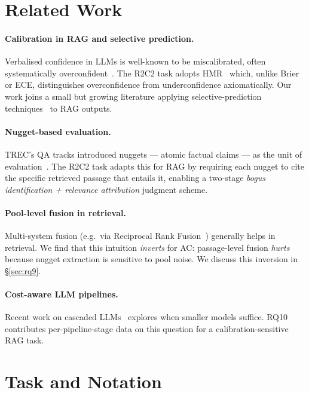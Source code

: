 \documentclass[11pt,a4paper]{article}
\begin{document}
\section{Related Work}

\paragraph{Calibration in RAG and selective prediction.}
Verbalised confidence in LLMs is well-known to be miscalibrated, often
systematically overconfident~\cite{kalai-confidence}. The R2C2 task adopts
HMR~\cite{sakai-hmr} which, unlike Brier or ECE, distinguishes
overconfidence from underconfidence axiomatically. Our work joins a small
but growing literature applying selective-prediction
techniques~\cite{el-yaniv-selective} to RAG outputs.

\paragraph{Nugget-based evaluation.}
TREC's QA tracks introduced nuggets — atomic factual claims —
as the unit of evaluation~\cite{nenkova-pyramid, sakai-nugget}. The
R2C2 task adapts this for RAG by requiring each nugget to cite the
specific retrieved passage that entails it, enabling a two-stage
\emph{bogus identification + relevance attribution} judgment scheme.

\paragraph{Pool-level fusion in retrieval.}
Multi-system fusion (e.g.\ via Reciprocal Rank
Fusion~\cite{cormack-rrf}) generally helps in retrieval. We find that
this intuition \emph{inverts} for AC: passage-level fusion \emph{hurts}
because nugget extraction is sensitive to pool noise. We discuss this
inversion in \S\ref{sec:rq9}.

\paragraph{Cost-aware LLM pipelines.}
Recent work on cascaded
LLMs~\cite{chen-frugalgpt, yue-large-language-model-cascades} explores
when smaller models suffice. RQ10 contributes per-pipeline-stage data
on this question for a calibration-sensitive RAG task.

\section{Task and Notation}
\end{document}
